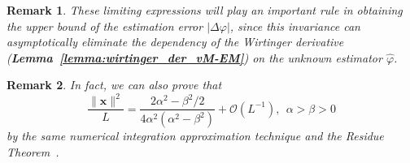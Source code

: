 \documentclass[journal,twocolumn]{IEEEtran}
\newtheorem{remark}{\bf Remark}
\theoremstyle{nonumberplain}
\begin{document}
{\begin{remark}
    These limiting expressions will play an important rule in obtaining the upper bound of the estimation error $|\Delta\varphi|$, since this invariance can asymptotically eliminate the dependency of the Wirtinger derivative ({\bf Lemma~\ref{lemma:wirtinger_der_vM-EM}}) on the unknown estimator $\hat{\varphi}$. 
\end{remark}

\begin{remark}
    In fact, we can also prove that 
    \begin{equation}
        \frac{\|{\bm x}\|^2}{L} = \frac{2\alpha^2-\beta^2/2}{4\alpha^2(\alpha^2-\beta^2)} + \mathcal{O}(L^{-1}),~~\alpha>\beta>0
    \end{equation}
    by the same numerical integration approximation technique and the Residue Theorem~\cite{martin1966complex}. 
\end{remark}


}
\end{document}
